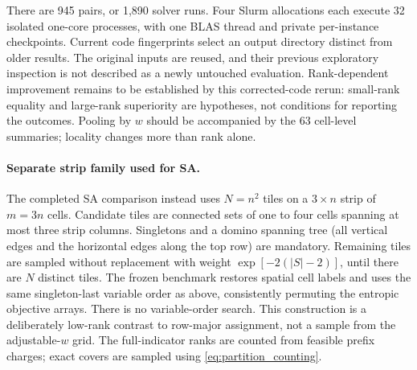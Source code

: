 There are 945 pairs, or 1,890 solver runs. Four Slurm allocations each execute
32 isolated one-core processes, with one BLAS thread and private per-instance
checkpoints. Current code fingerprints select an output directory distinct
from older results. The original inputs are reused, and their previous
exploratory inspection is not described as a newly untouched evaluation.
Rank-dependent improvement remains to be established by this corrected-code
rerun: small-rank equality and large-rank superiority are hypotheses, not
conditions for reporting the outcomes. Pooling by $w$ should be accompanied by
the 63 cell-level summaries; locality changes more than rank alone.

\paragraph{Separate strip family used for SA.}
The completed SA comparison instead uses $N=n^2$ tiles on a $3\times n$ strip
of $m=3n$ cells. Candidate tiles are connected sets of one to four cells spanning
at most three strip columns. Singletons and a domino spanning tree (all vertical
edges and the horizontal edges along the top row) are mandatory. Remaining
tiles are sampled without replacement with weight $\exp[-2(|S|-2)]$, until
there are $N$ distinct tiles. The frozen benchmark restores spatial cell labels
and uses the same singleton-last variable order as above, consistently
permuting the entropic objective arrays. There is no variable-order search.
This construction is a deliberately low-rank contrast to row-major assignment,
not a sample from the adjustable-$w$ grid. The full-indicator ranks are counted
from feasible prefix charges; exact covers are sampled using
\cref{eq:partition_counting}.

